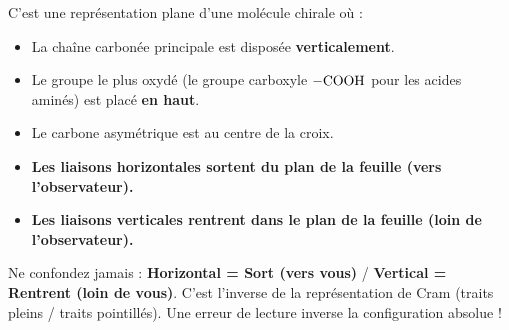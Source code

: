 \documentclass[11pt]{article}
\begin{document}
\begin{definition}
C'est une représentation plane d'une molécule chirale où :
\begin{itemize}
    \item La chaîne carbonée principale est disposée \textbf{verticalement}.
    \item Le groupe le plus oxydé (le groupe carboxyle $\ce{-COOH}$ pour les acides aminés) est placé \textbf{en haut}.
    \item Le carbone asymétrique est au centre de la croix.
    \item \textbf{Les liaisons horizontales sortent du plan de la feuille (vers l'observateur).}
    \item \textbf{Les liaisons verticales rentrent dans le plan de la feuille (loin de l'observateur).}
\end{itemize}
\end{definition}

\begin{attention}
Ne confondez jamais : \textbf{Horizontal = Sort (vers vous)} / \textbf{Vertical = Rentrent (loin de vous)}. C'est l'inverse de la représentation de Cram (traits pleins / traits pointillés). Une erreur de lecture inverse la configuration absolue !
\end{attention}
\end{document}
